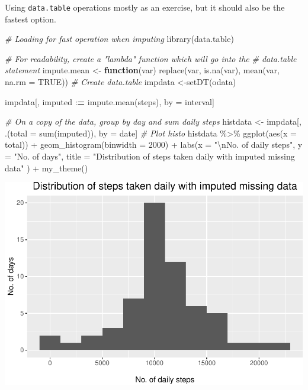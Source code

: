 \documentclass[
  paper=a4,
  ,captions=tableheading
]{scrartcl}
\newenvironment{Shaded}{\begin{snugshade}}{\end{snugshade}}
\newcommand{\AttributeTok}[1]{\textcolor[rgb]{0.77,0.63,0.00}{#1}}
\newcommand{\CommentTok}[1]{\textcolor[rgb]{0.56,0.35,0.01}{\textit{#1}}}
\newcommand{\ConstantTok}[1]{\textcolor[rgb]{0.00,0.00,0.00}{#1}}
\newcommand{\ControlFlowTok}[1]{\textcolor[rgb]{0.13,0.29,0.53}{\textbf{#1}}}
\newcommand{\DecValTok}[1]{\textcolor[rgb]{0.00,0.00,0.81}{#1}}
\newcommand{\ErrorTok}[1]{\textcolor[rgb]{0.64,0.00,0.00}{\textbf{#1}}}
\newcommand{\FunctionTok}[1]{\textcolor[rgb]{0.00,0.00,0.00}{#1}}
\newcommand{\NormalTok}[1]{#1}
\newcommand{\OtherTok}[1]{\textcolor[rgb]{0.56,0.35,0.01}{#1}}
\newcommand{\SpecialCharTok}[1]{\textcolor[rgb]{0.00,0.00,0.00}{#1}}
\newcommand{\StringTok}[1]{\textcolor[rgb]{0.31,0.60,0.02}{#1}}
\begin{document}
Using \texttt{data.table} operations mostly as an exercise, but it
should also be the fastest option.

\begin{Shaded}
\begin{Highlighting}[]
\CommentTok{\# Loading for fast operation when imputing}
\FunctionTok{library}\NormalTok{(data.table)}

\CommentTok{\# For readability, create a "lambda" function which will go into the}
\CommentTok{\# data.table statement}
\NormalTok{impute.mean }\OtherTok{\textless{}{-}} \ControlFlowTok{function}\NormalTok{(var) }\FunctionTok{replace}\NormalTok{(var, }\FunctionTok{is.na}\NormalTok{(var), }\FunctionTok{mean}\NormalTok{(var, }\AttributeTok{na.rm =} \ConstantTok{TRUE}\NormalTok{))}
\CommentTok{\# Create data.table}
\NormalTok{impdata }\OtherTok{\textless{}{-}}\FunctionTok{setDT}\NormalTok{(odata)}

\NormalTok{impdata[,}
\NormalTok{        imputed }\SpecialCharTok{:}\ErrorTok{=} \FunctionTok{impute.mean}\NormalTok{(steps),}
\NormalTok{        by }\OtherTok{=}\NormalTok{ interval]}

\CommentTok{\# On a copy of the data, group by day and sum daily steps}
\NormalTok{histdata }\OtherTok{\textless{}{-}}\NormalTok{ impdata[,}
\NormalTok{                    .(}\AttributeTok{total =} \FunctionTok{sum}\NormalTok{(imputed)),}
\NormalTok{                    by }\OtherTok{=}\NormalTok{ date]}
\CommentTok{\# Plot histo}
\NormalTok{histdata }\SpecialCharTok{\%\textgreater{}\%}
  \FunctionTok{ggplot}\NormalTok{(}\FunctionTok{aes}\NormalTok{(}\AttributeTok{x =}\NormalTok{ total)) }\SpecialCharTok{+}
  \FunctionTok{geom\_histogram}\NormalTok{(}\AttributeTok{binwidth =} \DecValTok{2000}\NormalTok{) }\SpecialCharTok{+}
  \FunctionTok{labs}\NormalTok{(}\AttributeTok{x =} \StringTok{"}\SpecialCharTok{\textbackslash{}n}\StringTok{No. of daily steps"}\NormalTok{,}
       \AttributeTok{y =} \StringTok{"No. of days"}\NormalTok{,}
       \AttributeTok{title =} \StringTok{"Distribution of steps taken daily with imputed missing data"}
\NormalTok{       ) }\SpecialCharTok{+}
  \FunctionTok{my\_theme}\NormalTok{()}
\end{Highlighting}
\end{Shaded}

\includegraphics{PA1_template_files/figure-latex/week-analysis-1.pdf}
\end{document}
